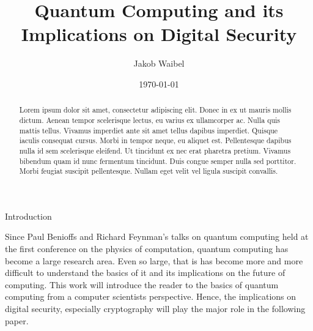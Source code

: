 \documentclass[aps,preprintnumbers,twocolumn]{revtex4}
\begin{document}
\title{Quantum Computing and its Implications on Digital Security}
\author{Jakob Waibel}


\date{\today}

\begin{abstract}
Lorem ipsum dolor sit amet, consectetur adipiscing elit. Donec in ex ut mauris mollis dictum. Aenean tempor scelerisque lectus, eu varius ex ullamcorper ac. Nulla quis mattis tellus. Vivamus imperdiet ante sit amet tellus dapibus imperdiet. Quisque iaculis consequat cursus. Morbi in tempor neque, eu aliquet est. Pellentesque dapibus nulla id sem scelerisque eleifend. Ut tincidunt ex nec erat pharetra pretium. Vivamus bibendum quam id nunc fermentum tincidunt. Duis congue semper nulla sed porttitor. Morbi feugiat suscipit pellentesque. Nullam eget velit vel ligula suscipit convallis.
\end{abstract}

\maketitle

\begin{section}{Introduction}
    
Since Paul Benioffs and Richard Feynman's talks on quantum computing held at the first conference on the physics of computation, 
quantum computing has become a large research area. 
Even so large, that is has become more and more difficult to understand the basics of it and its implications on the future of computing. 
This work will introduce the reader to the basics of quantum computing from a computer scientists perspective. 
Hence, the implications on digital security, especially cryptography will play the major role in the following paper. 

\end{section}
\end{document}
